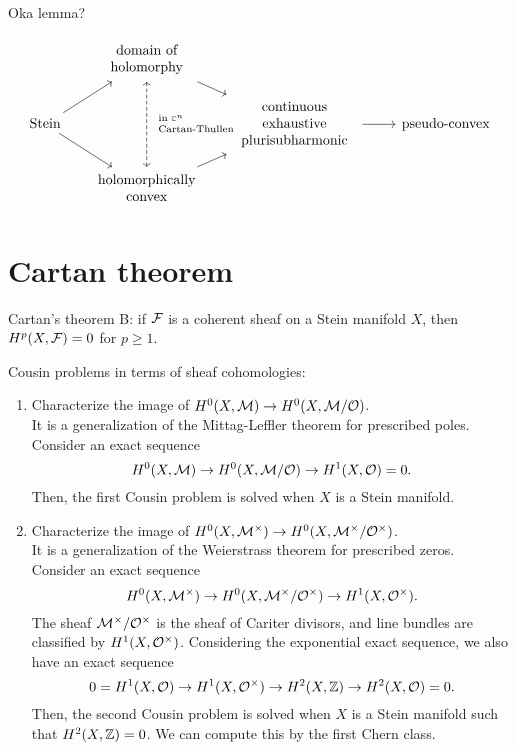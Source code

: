 \documentclass{../../large}
\begin{document}
\begin{prb}
\end{prb}

Oka lemma?

\[\begin{tikzcd}[sep=small]
& \tab{domain of\\holomorphy} \ar{dr}\ar[<->, dashed]{dd}{\scriptsize\tab[l]{in $\C^n$\\Cartan-Thullen}} &&&\\
\text{Stein} \ar{ur}\ar{dr} && \tab{continuous\\exhaustive\\plurisubharmonic} \ar{rr} && \text{pseudo-convex} \\
& \tab{holomorphically\\convex} \ar{ur} &&&
\end{tikzcd}\]


\section{Cartan theorem}

Cartan's theorem B: if $\mathcal{F}$ is a coherent sheaf on a Stein manifold $X$, then $H^p(X,\mathcal{F})=0$ for $p\ge1$.

Cousin problems in terms of sheaf cohomologies:
\begin{enumerate}
\item Characterize the image of $H^0(X,\mathcal{M})\to H^0(X,\mathcal{M}/\mathcal{O})$.\\
It is a generalization of the Mittag-Leffler theorem for prescribed poles.
Consider an exact sequence
\[H^0(X,\mathcal{M})\to H^0(X,\mathcal{M}/\mathcal{O})\to H^1(X,\mathcal{O})=0.\]
Then, the first Cousin problem is solved when $X$ is a Stein manifold.
\item Characterize the image of $H^0(X,\mathcal{M}^\times)\to H^0(X,\mathcal{M}^\times/\mathcal{O}^\times)$.\\
It is a generalization of the Weierstrass theorem for prescribed zeros.
Consider an exact sequence
\[H^0(X,\mathcal{M}^\times)\to H^0(X,\mathcal{M}^\times/\mathcal{O}^\times)\to H^1(X,\mathcal{O}^\times).\]
The sheaf $\mathcal{M}^\times/\mathcal{O}^\times$ is the sheaf of Cariter divisors, and line bundles are classified by $H^1(X,\mathcal{O}^\times)$.
Considering the exponential exact sequence, we also have an exact sequence
\[0=H^1(X,\mathcal{O})\to H^1(X,\mathcal{O}^\times)\to H^2(X,\mathbb{Z})\to H^2(X,\mathcal{O})=0.\]
Then, the second Cousin problem is solved when $X$ is a Stein manifold such that $H^2(X,\mathbb{Z})=0$.
We can compute this by the first Chern class.
\end{enumerate}
\end{document}
